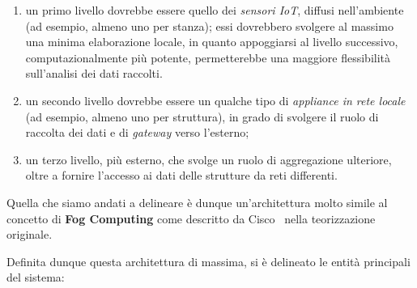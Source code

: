 \begin{enumerate}
  \item
    un primo livello dovrebbe essere quello dei \emph{sensori IoT}, diffusi nell'ambiente (ad esempio, almeno uno per stanza);
    essi dovrebbero svolgere al massimo una minima elaborazione locale,
    in quanto appoggiarsi al livello successivo, computazionalmente più potente, permetterebbe una maggiore flessibilità sull'analisi dei dati raccolti.
  \item
    un secondo livello dovrebbe essere un qualche tipo di \emph{appliance in rete locale} (ad esempio, almeno uno per struttura),
    in grado di svolgere il ruolo di raccolta dei dati e di \emph{gateway} verso l'esterno;
  \item
    un terzo livello, più esterno, che svolge un ruolo di aggregazione ulteriore, oltre a fornire l'accesso ai dati delle strutture da reti differenti.
\end{enumerate}

Quella che siamo andati a delineare è dunque un'architettura molto simile al concetto di \textbf{Fog Computing} come descritto da Cisco~\cite{CiscoSystems2016} nella teorizzazione originale.

Definita dunque questa architettura di massima, si è delineato le entità principali del sistema:

